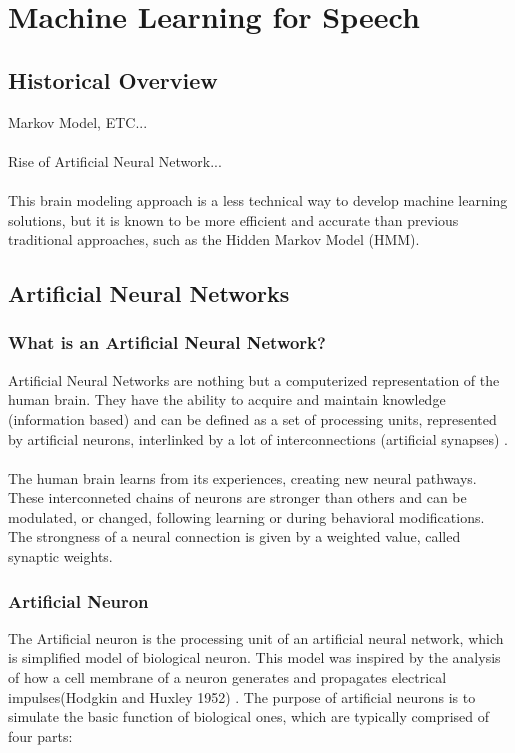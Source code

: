 \chapter{Machine Learning for Speech}\label{ch:machine_learning}

\section{Historical Overview}
Markov Model, ETC...\\\\
Rise of Artificial Neural Network...\\\\
This brain modeling approach is a less technical way to develop machine learning solutions, but it is known to be more efficient and accurate than previous traditional approaches,
such as the Hidden Markov Model (HMM). 

\section{Artificial Neural Networks}
\subsection{What is an Artificial Neural Network?}
Artificial Neural Networks are nothing but a computerized representation of the human brain. 
They have the ability to acquire and maintain knowledge (information based) and can be defined as a set of processing units, represented by artificial neurons,
interlinked by a lot of interconnections
(artificial synapses) \cite[p.~5]{Silva2016}.\\\\
The human brain learns from its experiences, creating new neural pathways. These interconneted chains of neurons are stronger than others and can be modulated, or changed,
following learning or during behavioral modifications.
The strongness of a neural connection is given by a weighted value, called synaptic weights.

\subsection{Artificial Neuron}
The Artificial neuron is the processing unit of an artificial neural network, which is simplified model of biological neuron.
This model was inspired by the analysis of how a cell membrane of a neuron generates and propagates electrical impulses(Hodgkin and Huxley 1952) \cite[p.~11]{Silva2016}.
The purpose of artificial neurons is to simulate the basic function of biological ones,
which are typically comprised of four parts:

